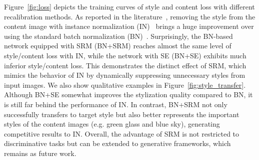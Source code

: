 Figure~\ref{fig:loss} depicts the training curves of style and content loss with different recalibration methods.
As reported in the literature~\cite{ulyanov2017improved, nam2018batch}, removing the style from the content image with instance normalization (IN)~\cite{ulyanov2016instance} brings a huge improvement over using the standard batch normalization (BN)~\cite{ioffe2015batch}.
Surprisingly, the BN-based network equipped with SRM (BN+SRM) reaches almost the same level of style/content loss with IN, while the network with SE (BN+SE) exhibits much inferior style/content loss.
This demonstrates the distinct effect of SRM, which mimics the behavior of IN by dynamically suppressing unnecessary styles from input images.
We also show qualitative examples in Figure~\ref{fig:style_transfer}.
Although BN+SE somewhat improves the stylization quality compared to BN, it is still far behind the performance of IN.
In contrast, BN+SRM not only successfully transfers to target style but also better represents the important styles of the content images (e.g. green glass and blue sky), generating competitive results to IN.
Overall, the advantage of SRM is not restricted to discriminative tasks but can be extended to generative frameworks, which remains as future work.
%

